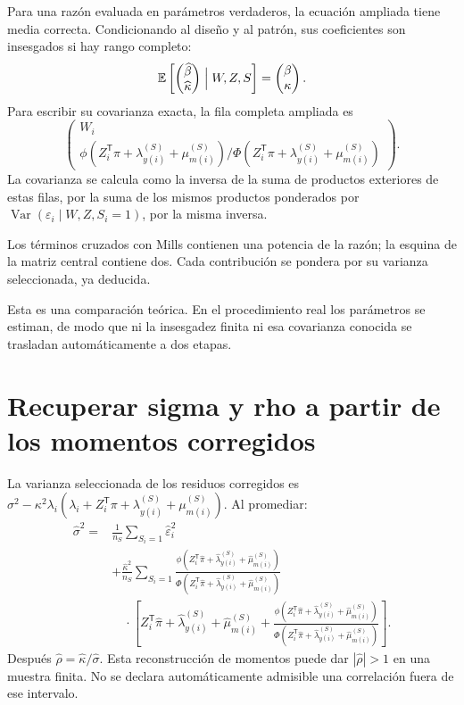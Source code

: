 \documentclass[11pt,a4paper]{article}
\newcommand{\E}{\mathbb E}
\newcommand{\abs}[1]{\left\lvert #1\right\rvert}
\DeclareMathOperator{\Var}{Var}
\begin{document}
Para una razón evaluada en parámetros verdaderos, la ecuación ampliada tiene media correcta. Condicionando al diseño y al patrón, sus coeficientes son insesgados si hay rango completo:
\[
\E\left[\begin{pmatrix}\widehat\beta\\\widehat\kappa\end{pmatrix}\Bigm|W,Z,S\right]
=\begin{pmatrix}\beta\\\kappa\end{pmatrix}.
\]
Para escribir su covarianza exacta, la fila completa ampliada es
\[
\begin{pmatrix}
W_i\\
\phi(Z_i^{\mathsf T}\pi+\lambda_{y(i)}^{(S)}+\mu_{m(i)}^{(S)})
/\Phi(Z_i^{\mathsf T}\pi+\lambda_{y(i)}^{(S)}+\mu_{m(i)}^{(S)})
\end{pmatrix}.
\]
La covarianza se calcula como la inversa de la suma de productos exteriores de estas filas, por la suma de los mismos productos ponderados por
$\Var(\varepsilon_i\mid W,Z,S_i=1)$, por la misma inversa.

Los términos cruzados con Mills contienen una potencia de la razón; la esquina de la matriz central contiene dos. Cada contribución se pondera por su varianza seleccionada, ya deducida.

Esta es una comparación teórica. En el procedimiento real los parámetros se estiman, de modo que ni la insesgadez finita ni esa covarianza conocida se trasladan automáticamente a dos etapas.

\clearpage
\section{Recuperar sigma y rho a partir de los momentos corregidos}

La varianza seleccionada de los residuos corregidos es
$\sigma^2-\kappa^2\lambda_i(\lambda_i+Z_i^{\mathsf T}\pi+
\lambda_{y(i)}^{(S)}+\mu_{m(i)}^{(S)})$. Al promediar:
\[
\begin{aligned}
\widehat\sigma^2={}&
\frac1{n_S}\sum_{S_i=1}\widehat\varepsilon_i^2\\
&+\frac{\widehat\kappa^2}{n_S}\sum_{S_i=1}
\frac{\phi(Z_i^{\mathsf T}\widehat\pi+\widehat\lambda_{y(i)}^{(S)}+\widehat\mu_{m(i)}^{(S)})}
{\Phi(Z_i^{\mathsf T}\widehat\pi+\widehat\lambda_{y(i)}^{(S)}+\widehat\mu_{m(i)}^{(S)})}\\
&\quad\cdot\left[
Z_i^{\mathsf T}\widehat\pi+\widehat\lambda_{y(i)}^{(S)}+\widehat\mu_{m(i)}^{(S)}
+\frac{\phi(Z_i^{\mathsf T}\widehat\pi+\widehat\lambda_{y(i)}^{(S)}+\widehat\mu_{m(i)}^{(S)})}
{\Phi(Z_i^{\mathsf T}\widehat\pi+\widehat\lambda_{y(i)}^{(S)}+\widehat\mu_{m(i)}^{(S)})}
\right].
\end{aligned}
\]
Después $\widehat\rho=\widehat\kappa/\widehat\sigma$. Esta reconstrucción de momentos puede dar $\abs{\widehat\rho}>1$ en una muestra finita. No se declara automáticamente admisible una correlación fuera de ese intervalo.
\end{document}
